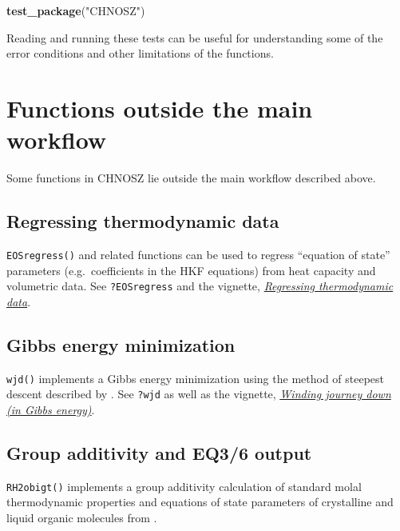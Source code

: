\documentclass[]{tufte-handout}
\newenvironment{Shaded}{}{}
\newcommand{\KeywordTok}[1]{\textcolor[rgb]{0.00,0.44,0.13}{\textbf{#1}}}
\newcommand{\StringTok}[1]{\textcolor[rgb]{0.25,0.44,0.63}{#1}}
\newcommand{\NormalTok}[1]{#1}
\begin{document}
\begin{Shaded}
\begin{Highlighting}[]
\KeywordTok{test_package}\NormalTok{(}\StringTok{"CHNOSZ"}\NormalTok{)}
\end{Highlighting}
\end{Shaded}

Reading and running these tests can be useful for understanding some of
the error conditions and other limitations of the functions.

\section{Functions outside the main
workflow}\label{functions-outside-the-main-workflow}

Some functions in CHNOSZ lie outside the main workflow described above.

\subsection{Regressing thermodynamic
data}\label{regressing-thermodynamic-data}

{\texttt{EOSregress()}} and related functions can be used to regress
``equation of state'' parameters (e.g.~coefficients in the HKF
equations) from heat capacity and volumetric data. See
{\texttt{?EOSregress}} and the vignette,
\href{eos-regress.html}{{\emph{Regressing thermodynamic data}}}.

\subsection{Gibbs energy minimization}\label{gibbs-energy-minimization}

{\texttt{wjd()}} implements a Gibbs energy minimization using the method
of steepest descent described by \citet{WJD58}. See {\texttt{?wjd}} as
well as the vignette, \href{wjd.pdf}{{\emph{Winding journey down (in
Gibbs energy)}}}.

\subsection{Group additivity and EQ3/6
output}\label{group-additivity-and-eq36-output}

{\texttt{RH2obigt()}} implements a group additivity calculation of
standard molal thermodynamic properties and equations of state
parameters of crystalline and liquid organic molecules from
\citet{RH98}.
\end{document}
